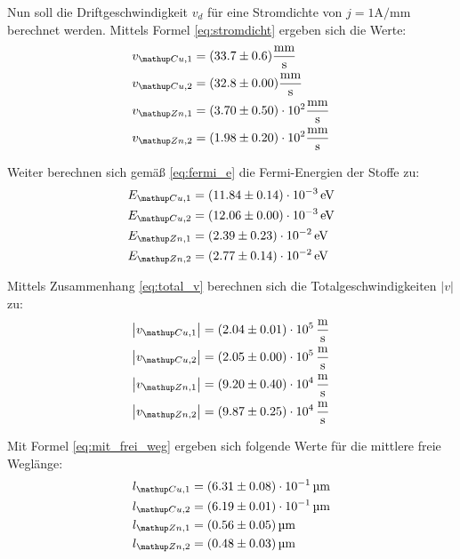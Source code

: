 Nun soll die Driftgeschwindigkeit $v_d$ für eine Stromdichte von $j = 1 \si{\ampere \per \milli \meter}$ berechnet werden. Mittels Formel
\eqref{eq:stromdicht} ergeben sich die Werte:
\begin{align}
\begin{aligned}
v\ua{Cu,1} &= (33.7 \pm 0.6)   \si{\milli\meter\per\second}  \\%
v\ua{Cu,2} &= (32.8 \pm 0.00)  \si{\milli\meter\per\second}  \\
v\ua{Zn,1} &= (3.70 \pm 0.50)\cdot 10^{ 2}   \si{\milli\meter\per\second} \\
v\ua{Zn,2} &= (1.98 \pm 0.20)\cdot 10^{ 2}   \si{\milli\meter\per\second}
\end{aligned}
\end{align}

Weiter berechnen sich gemäß \eqref{eq:fermi_e} die Fermi-Energien der Stoffe zu: %
\begin{align}
\begin{aligned}
E\ua{Cu,1} &= (11.84 \pm 0.14)\cdot 10^{-3} \, \si{\eV}  \\%
E\ua{Cu,2} &= (12.06 \pm 0.00)\cdot 10^{-3} \, \si{\eV}  \\
E\ua{Zn,1} &= (2.39 \pm 0.23)\cdot 10^{-2}  \,  \si{\eV} \\
E\ua{Zn,2} &= (2.77 \pm 0.14)\cdot 10^{-2}  \, \si{\eV}
\end{aligned}
\end{align}

Mittels Zusammenhang \eqref{eq:total_v} berechnen sich die Totalgeschwindigkeiten $\left| v \right| $ zu:
\begin{align}
\begin{aligned}
\left|v\ua{Cu,1}\right| &= (2.04 \pm 0.01)\cdot 10^5 \, \si{\meter \per \second}  \\%
\left|v\ua{Cu,2}\right| &= (2.05 \pm 0.00)\cdot 10^5 \, \si{\meter \per \second}  \\
\left|v\ua{Zn,1}\right| &= (9.20 \pm 0.40)\cdot 10^4 \, \si{\meter \per \second}  \\
\left|v\ua{Zn,2}\right| &= (9.87 \pm 0.25)\cdot 10^4 \, \si{\meter \per \second}
\end{aligned}
\end{align}

Mit Formel \eqref{eq:mit_frei_weg} ergeben sich folgende Werte für die mittlere freie Weglänge:
\begin{align}
\begin{aligned}
l\ua{Cu,1} &= (6.31 \pm 0.08)\cdot 10^{-1} \, \si{\micro\meter}  \\%
l\ua{Cu,2} &= (6.19 \pm 0.01)\cdot 10^{-1} \, \si{\micro\meter}  \\
l\ua{Zn,1} &= (0.56 \pm 0.05) \, \si{\micro\meter}  \\
l\ua{Zn,2} &= (0.48 \pm 0.03) \, \si{\micro\meter}
\end{aligned}
\end{align}


